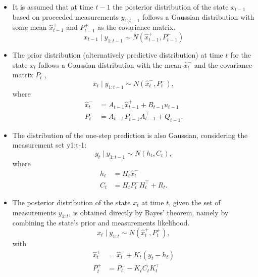 \begin{itemize}
    \item It is assumed that at time \(t-1\) the posterior distribution of the state \(x_{t-1}\) based on proceeded measurements \(y_{1:t-1}\) follows a Gaussian distribution with some mean \(\hat{x}^{+}_{t-1}\) and \(P^{+}_{t-1}\) as the covariance matrix.
    \begin{equation}
        x_{t-1} \mid y_{1:t-1} \sim N(\hat{x}^{+}_{t-1},P^{+}_{t-1})
    \end{equation}
    \item The prior distribution (alternatively predictive distribution) at time \(t\) for the state \(x_t\) follows a Gaussian distribution with the mean \(\hat{x}_t^{-}\) and the covariance matrix \(P_t^{-}\),
        \begin{equation}
        x_t \mid y_{1:t-1} \sim N(\hat{x}^{-}_t,P^{-}_t),
        \end{equation}
    where
    \begin{align*}
            \hat{x}_t^{-}&= A_{t-1} \hat{x}_{t-1}^{+} + B_{t-1} u_{t-1}  \\
            P_t^{-}&=A_{t-1} P_{t-1}^{+} A_{t-1}^\intercal + Q_{t-1}.
    \end{align*}
    \item The distribution of the one-step prediction is also Gaussian, considering the measurement set y1:t-1:
        \begin{equation}
        y_t \mid y_{1:t-1} \sim N(h_t,C_t), 
        \end{equation}
    where
    \begin{align*}
            h_t&= H_t \hat{x}^{-}_t  \\
            C_t&=H_t P_t^{-} H_t^\intercal + R_t.
    \end{align*}
    \item The posterior distribution of the state \(x_t\) at time \(t\), given the set of measurements \(y_{1:t}\), is obtained directly by Bayes' theorem, namely by combining the state's prior and measurements likelihood.
        \begin{equation}
        x_t \mid y_{1:t} \sim N(\hat{x}^{+}_t,P^{+}_t), 
        \end{equation}
    with 
    \begin{align*}
            \hat{x}^{+}_t&= \hat{x}^{-}_t + K_t (y_t - h_t)  \\
            P^{+}_t&=P_t^{-} - K_t C_t K_t^\intercal
    \end{align*}
\end{itemize}

